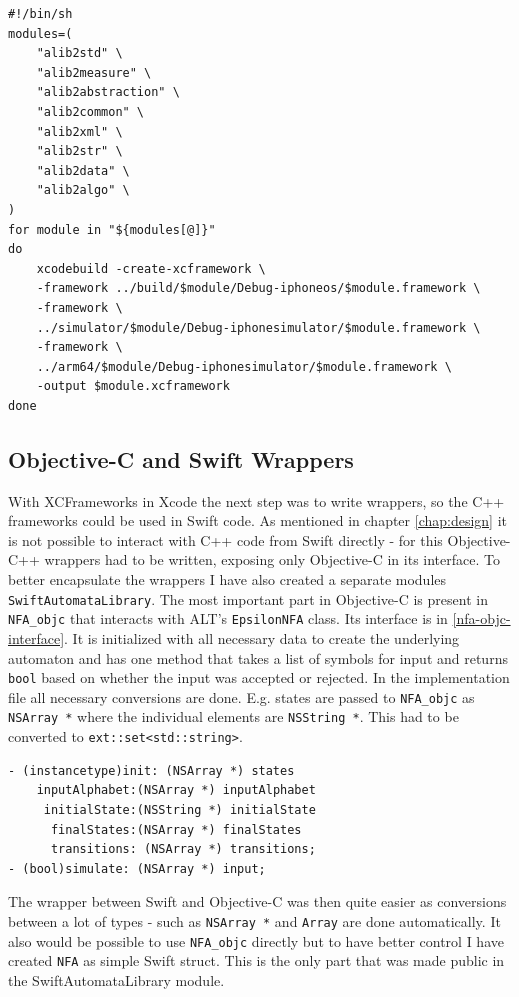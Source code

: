 \begin{lstlisting}[caption=XCFramework shell script, label=xcframework-bundle]
#!/bin/sh
modules=(
    "alib2std" \
    "alib2measure" \
    "alib2abstraction" \
    "alib2common" \
    "alib2xml" \
    "alib2str" \
    "alib2data" \
    "alib2algo" \
)
for module in "${modules[@]}"
do
    xcodebuild -create-xcframework \
    -framework ../build/$module/Debug-iphoneos/$module.framework \
    -framework \
    ../simulator/$module/Debug-iphonesimulator/$module.framework \
    -framework \
    ../arm64/$module/Debug-iphonesimulator/$module.framework \
    -output $module.xcframework
done
\end{lstlisting}

\subsection{Objective-C and Swift Wrappers}

With XCFrameworks in Xcode the next step was to write wrappers, so the C++ frameworks could be used in Swift code. As mentioned in chapter \ref{chap:design} it is not possible to interact with C++ code from Swift directly - for this Objective-C++ wrappers had to be written, exposing only Objective-C in its interface. To better encapsulate the wrappers I have also created a separate modules \lstinline{SwiftAutomataLibrary}. The most important part in Objective-C is present in \lstinline{NFA_objc} that interacts with ALT's \lstinline{EpsilonNFA} class. Its interface is in \ref{nfa-objc-interface}. It is initialized with all necessary data to create the underlying automaton and has one method that takes a list of symbols for input and returns \lstinline{bool} based on whether the input was accepted or rejected. In the implementation file all necessary conversions are done. E.g. states are passed to \lstinline{NFA_objc} as \lstinline{NSArray *} where the individual elements are \lstinline{NSString *}. This had to be converted to \lstinline{ext::set<std::string>}.

\begin{lstlisting}[caption={NFA\_objc interface}, label=nfa-objc-interface]
- (instancetype)init: (NSArray *) states
    inputAlphabet:(NSArray *) inputAlphabet
     initialState:(NSString *) initialState
      finalStates:(NSArray *) finalStates
      transitions: (NSArray *) transitions;
- (bool)simulate: (NSArray *) input;
\end{lstlisting}

The wrapper between Swift and Objective-C was then quite easier as conversions between a lot of types - such as \lstinline{NSArray *} and \lstinline{Array} are done automatically. It also would be possible to use \lstinline{NFA_objc} directly but to have better control I have created \lstinline{NFA} as simple Swift struct. This is the only part that was made public in the SwiftAutomataLibrary module.

